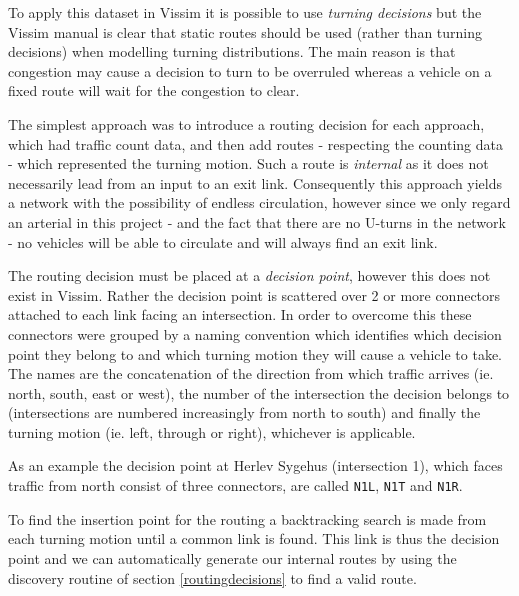 To apply this dataset in Vissim it is possible to use \textit{turning decisions} but the Vissim manual is clear that static routes should be used (rather than turning decisions) when modelling turning distributions. The main reason is that congestion may cause a decision to turn to be overruled whereas a vehicle on a fixed route will wait for the congestion to clear. 

The simplest approach was to introduce a routing decision for each approach, which had traffic count data, and then add routes - respecting the counting data - which represented the turning motion. Such a route is \textit{internal} as it does not necessarily lead from an input to an exit link. Consequently this approach yields a network with the possibility of endless circulation, however since we only regard an arterial in this project - and the fact that there are no U-turns in the network - no vehicles will be able to circulate and will always find an exit link.

The routing decision must be placed at a \textit{decision point}, however this does not exist in Vissim. Rather the decision point is scattered over 2 or more connectors attached to each link facing an intersection. In order to overcome this these connectors were grouped by a naming convention which identifies which decision point they belong to and which turning motion they will cause a vehicle to take. 
The names are the concatenation of the direction from which traffic arrives (ie. north, south, east or west), the number of the intersection the decision belongs to (intersections are numbered increasingly from north to south) and finally the turning motion (ie. left, through or right), whichever is applicable. 

As an example the decision point at Herlev Sygehus (intersection 1), which faces traffic from north consist of three connectors, are called \verb|N1L|, \verb|N1T| and \verb|N1R|.

To find the insertion point for the routing a backtracking search is made from each turning motion until a common link is found. This link is thus the decision point and we can automatically generate our internal routes by using the discovery routine of section \ref{routingdecisions} to find a valid route.


